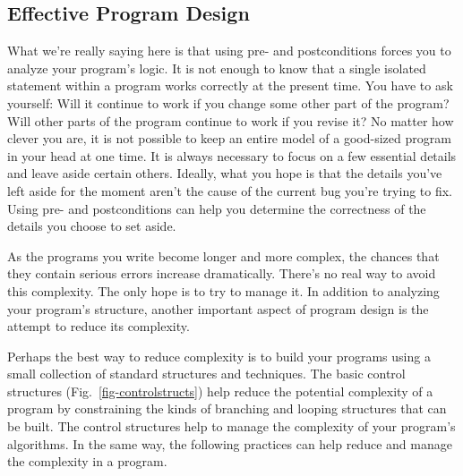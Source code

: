 \subsection*{Effective Program Design}
\noindent What we're really saying here is that using pre- and postconditions
forces you to analyze your program's logic.  It is not enough to know
that a single isolated statement within a program works correctly at
the present time. You have to ask yourself: Will it continue to work
if you change some other part of the program? Will other parts of the
program continue to work if you revise it? No matter how clever you
are, it is not possible to keep an entire model of a good-sized
program in your head at one time. It is always necessary to focus on a
few essential details and leave aside certain others. Ideally, what
you hope is that the details you've left aside for the moment
aren't the cause of the current bug you're trying to fix.  Using pre-
and postconditions can help you determine the correctness of the
details you choose to set aside.



\noindent As the programs you write become longer and more complex,
the chances that they contain serious errors increase dramatically.
There's no real way to avoid this complexity. The only hope is to try
to manage it. In addition to analyzing your program's structure,
another important aspect of program design is the attempt to reduce
its complexity.


\noindent Perhaps the best way to reduce complexity is to build your programs
using a small collection of standard structures and techniques.  The
basic control structures (Fig.~\ref{fig-controlstructs}) help reduce
the potential complexity of a program by constraining the kinds of
branching and looping structures that can be built. The control
structures help to manage the complexity of your program's algorithms.
In the same way, the following practices can help reduce and manage
the complexity in a program.

